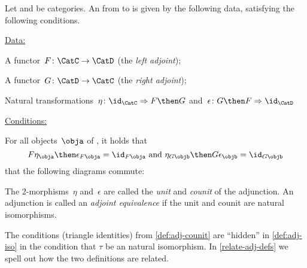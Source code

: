 \begin{ctdefinition}
  \label{def:adj-counit}
  \label{def:cat-adjunction-v2}
  Let \CatC and \CatD be categories. An \emph{} from \CatC to \CatD is given by the following data, satisfying the following conditions.

  \underline{Data:}
  \begin{compactenum}
    \item A functor~$F\colon \CatC \to \CatD$ (the \emph{left adjoint});
    \item A functor~$G\colon \CatD \to \CatC$ (the \emph{right adjoint});
    \item Natural transformations~$\eta \colon \id_\CatC \Rightarrow F \then G$ and~$\epsilon \colon G \then F \Rightarrow \id_\CatD$
  \end{compactenum}

  \underline{Conditions:}
  \begin{compactenum}
    \item For all objects~$\obja$ of \CatC, it holds that
    \begin{equation*}
      F\eta_\obja \then \epsilon_{F\obja} = \id_{F\obja} \text{ and }  \eta_{G\objb} \then G\epsilon_\objb = \id_{G\objb}
    \end{equation*}
     that the following diagrams commute:

    \begin{center}
    \end{center}
  \end{compactenum}

  The 2-morphisms~$\eta$ and~$\epsilon$ are called the \emph{unit} and \emph{counit} of the adjunction.
  An adjunction is called an \emph{adjoint equivalence} if the unit and counit are natural isomorphisms.
\end{ctdefinition}

\begin{remark}
  The conditions (triangle identities) from \cref{def:adj-counit} are ``hidden'' in \cref{def:adj-iso} in the condition that $\tau$ be an natural isomorphism. In \cref{relate-adj-defs} we spell out how the two definitions are related.
\end{remark}
